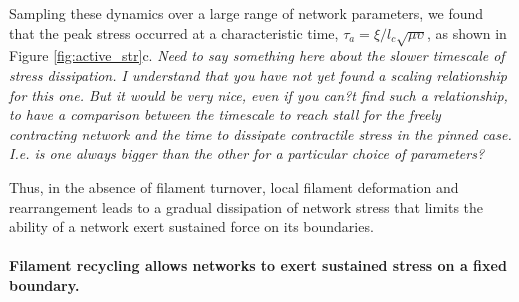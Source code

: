 \documentclass[10pt,letterpaper]{article}
\begin{document}
Sampling these dynamics over a large range of network parameters, we found that the peak stress occurred at a characteristic time, $\tau_a=\xi/l_c\sqrt{\mu\upsilon}$, as shown in Figure \ref{fig:active_str}c. 
{\em Need to say something here about the slower timescale of stress dissipation.  I understand that you have not yet found a scaling relationship for this one.  But it would be very nice, even if you can?t find such a relationship, to have a comparison between  the timescale to reach stall for the freely contracting network and the time to dissipate contractile stress in the pinned case. I.e. is one always bigger than the other for a particular choice of parameters? }

Thus, in the absence of filament turnover, local filament deformation and rearrangement leads to a gradual dissipation of network stress that limits the ability of a network exert sustained force on its boundaries. 


\paragraph{Filament recycling allows networks to exert sustained stress on a fixed boundary.}
\end{document}
